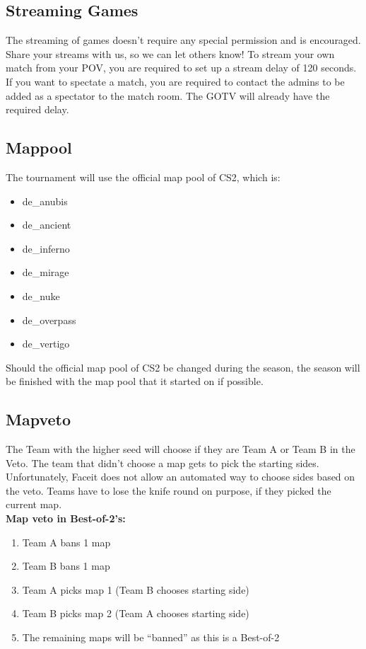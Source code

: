 \documentclass{article}
\begin{document}
\subsection{Streaming Games}
The streaming of games doesn't require any special permission and is encouraged. Share your streams with us, so we can let others know! To stream your own match from your POV, you are required to set up a stream delay of 120 seconds. If you want to spectate a match, you are required to contact the admins to be added as a spectator to the match room. The GOTV will already have the required delay.

\subsection{Mappool}
The tournament will use the official map pool of CS2, which is:
\begin{itemize}
    \item de\_anubis
    \item de\_ancient
    \item de\_inferno
    \item de\_mirage
    \item de\_nuke
    \item de\_overpass
    \item de\_vertigo 
\end{itemize}
Should the official map pool of CS2 be changed during the season, the season will be finished with the map pool that it started on if possible.


\subsection{Mapveto}
\newcommand{\TeamA}{{\color{red}Team A }}
\newcommand{\TeamB}{{\color{blue}Team B }}
The Team with the higher seed will choose if they are \TeamA or \TeamB in the Veto. The team that didn't choose a map gets to pick the starting sides. Unfortunately, Faceit does not allow an automated way to choose sides based on the veto. Teams have to lose the knife round on purpose, if they picked the current map.\\

\textbf{Map veto in Best-of-2's:}
\begin{enumerate}
    \item \TeamA bans 1 map
    \item \TeamB bans 1 map
    \item \TeamA picks map 1 (\TeamB chooses starting side)
    \item \TeamB picks map 2 (\TeamA chooses starting side)
    \item The remaining maps will be “banned” as this is a Best-of-2
\end{enumerate}
\end{document}
